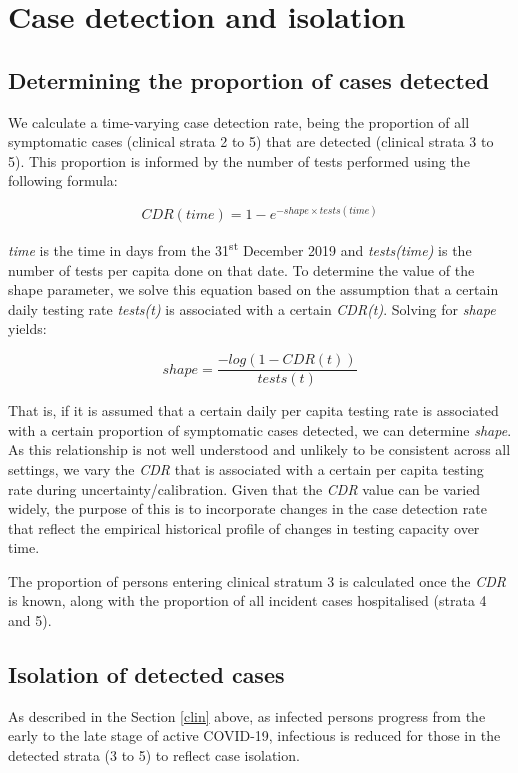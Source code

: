 \section{Case detection and isolation} \label{cdr}

\subsection{Determining the proportion of cases detected}
We calculate a time-varying case detection rate, being the proportion of all symptomatic cases (clinical strata 2 to 5) that are detected (clinical strata 3 to 5). This proportion is informed by the number of tests performed using the following formula:

\[CDR(time)=1-e^{-shape \times tests(time)}\]

\textit{time} is the time in days from the 31\textsuperscript{st} December 2019 and \textit{tests(time)} is the number of tests per capita done on that date. To determine the value of the shape parameter, we solve this equation based on the assumption that a certain daily testing rate \textit{tests(t)} is associated with a certain \textit{CDR(t)}. Solving for \textit{shape} yields:

\[shape = \frac{-log(1 - CDR(t))}{tests(t)}\]

That is, if it is assumed that a certain daily per capita testing rate is associated with a certain proportion of symptomatic cases detected, we can determine \textit{shape}.
As this relationship is not well understood and unlikely to be consistent across all settings, we vary the \textit{CDR} that is associated with a certain per capita testing rate during uncertainty/calibration.
Given that the \textit{CDR} value can be varied widely, the purpose of this is to incorporate changes in the case detection rate that reflect the empirical historical profile of changes in testing capacity over time.

The proportion of persons entering clinical stratum 3 is calculated once the \textit{CDR} is known, along with the proportion of all incident cases hospitalised (strata 4 and 5).

\subsection{Isolation of detected cases}
As described in the Section \ref{clin} above, as infected persons progress from the early to the late stage of active COVID-19, infectious is reduced for those in the detected strata (3 to 5) to reflect case isolation.
